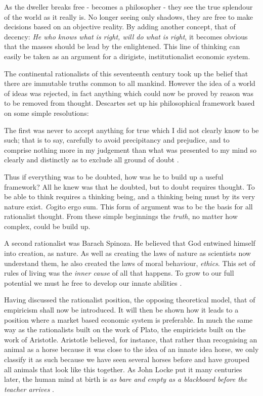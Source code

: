 As the dweller breaks free - becomes a philosopher - they see the true splendour of the world as it really is. No longer seeing only shadows, they are free to make decisions based on an objective reality. By adding another concept, that of decency: \textit{He who knows what is right, will do what is right}, it becomes obvious that the masses should be lead by the enlightened. This line of thinking can easily be taken as an argument for a dirigiste, institutionalist economic system.

The continental rationalists of this seventeenth century took up the belief that there are immutable truths common to all mankind. However the idea of a world of ideas was rejected, in fact anything which could now be proved by reason was to be removed from thought. Descartes set up his philosophical framework based on some simple resolutions:

\begin{displayquote}
The first was never to accept anything for true which I did not clearly know to be such; that is to say, carefully to avoid precipitancy and prejudice, and to comprise nothing more in my judgement than what was presented to my mind so clearly and distinctly as to exclude all ground of doubt \citep{Descartes:1637}.
\end{displayquote}

Thus if everything was to be doubted, how was he to build up a useful framework? All he knew was that he doubted, but to doubt requires thought. To be able to think requires a thinking being, and a thinking being must by its very nature exist. {\titlefont\textit Cogito ergo sum}. This form of argument was to bc the basis for all rationalist thought. From these simple beginnings the \textit{truth}, no matter how complex, could be build up.

A second rationalist was Barach Spinoza. He believed that God entwined himself into creation, as nature. As well as creating the laws of nature as scientists now understand them, he also created the laws of moral behaviour, \textit{ethics}. This set of rules of living was the \textit{inner cause} of all that happens. To grow to our full potential we must he free to develop our innate abilities \citep{Spinoza:1677}.

Having discussed the rationalist position, the opposing theoretical model, that of empiricism shall now be introduced. It will then be shown how it leads to a position where a market based economic system is preferable. In much the same way as the rationalists built on the work of Plato, the empiricists built on the work of Aristotle. Aristotle believed, for instance, that rather than recognising an animal as a horse because it was close to the idea of an innate idea horse, we only classify it as such because we have seen several horses before and have grouped all animals that look like this together. As John Locke put it many centuries later, the human mind at birth is \textit{as bare and empty as a blackboard before the teacher arrives} \citep{Locke:1689}.

